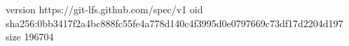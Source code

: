 version https://git-lfs.github.com/spec/v1
oid sha256:0bb3417f2a4bc888fc55fe4a778d140c4f3995d0e0797669c73df17d2204d197
size 196704
